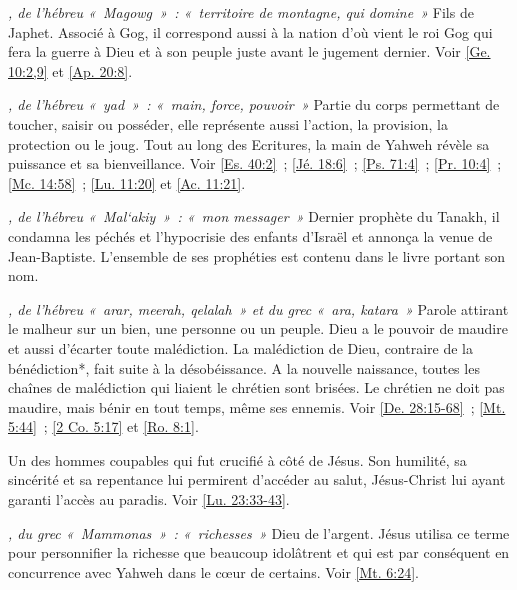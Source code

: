 \begin{multicols}{2}
\textit{, de l'hébreu «~Magowg~»~: «~territoire de montagne, qui domine~»}\newline
Fils de Japhet. Associé à Gog, il correspond aussi à la nation d'où vient le roi Gog qui fera la guerre à Dieu et à son peuple juste avant le jugement dernier. Voir \vref{Ge. 10:2,9} et \vref{Ap. 20:8}.

\textit{, de l'hébreu «~yad~»~: «~main, force, pouvoir~»}\newline
Partie du corps permettant de toucher, saisir ou posséder, elle représente aussi l'action, la provision, la protection ou le joug. Tout au long des Ecritures, la main de Yahweh révèle sa puissance et sa bienveillance. Voir \vref{Es. 40:2}~; \vref{Jé. 18:6}~; \vref{Ps. 71:4}~; \vref{Pr. 10:4}~; \vref{Mc. 14:58}~; \vref{Lu. 11:20} et \vref{Ac. 11:21}.

\textit{, de l'hébreu «~Mal`akiy~»~: «~mon messager~»}\newline
Dernier prophète du Tanakh, il condamna les péchés et l'hypocrisie des enfants d'Israël et annonça la venue de Jean-Baptiste. L'ensemble de ses prophéties est contenu dans le livre portant son nom.

\textit{, de l'hébreu «~arar, meerah, qelalah~» et du grec «~ara, katara~»}\newline
Parole attirant le malheur sur un bien, une personne ou un peuple. Dieu a le pouvoir de maudire et aussi d'écarter toute malédiction. La malédiction de Dieu, contraire de la bénédiction*, fait suite à la désobéissance. A la nouvelle naissance, toutes les chaînes de malédiction qui liaient le chrétien sont brisées. Le chrétien ne doit pas maudire, mais bénir en tout temps, même ses ennemis. Voir \vref{De. 28:15-68}~; \vref{Mt. 5:44}~; \vref{2 Co. 5:17} et \vref{Ro. 8:1}.

\textit{}\newline
Un des hommes coupables qui fut crucifié à côté de Jésus. Son humilité, sa sincérité et sa repentance lui permirent d'accéder au salut, Jésus-Christ lui ayant garanti l'accès au paradis. Voir \vref{Lu. 23:33-43}.

\textit{, du grec «~Mammonas~»~: «~richesses~»}\newline
Dieu de l'argent. Jésus utilisa ce terme pour personnifier la richesse que beaucoup idolâtrent et qui est par conséquent en concurrence avec Yahweh dans le cœur de certains. Voir \vref{Mt. 6:24}.


\end{multicols}

